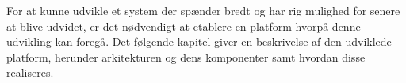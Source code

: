 For at kunne udvikle et system der spænder bredt og har rig mulighed for senere at blive udvidet, er det nødvendigt at etablere en platform hvorpå denne udvikling kan foregå.
Det følgende kapitel giver en beskrivelse af den udviklede platform, herunder arkitekturen og dens komponenter samt hvordan disse realiseres.
